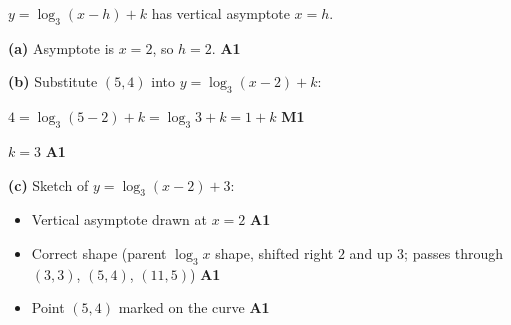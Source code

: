 \documentclass[12pt, twoside]{article}
\begin{document}
\begin{enumerate}[itemsep=0.3cm]
$y = \log_3(x - h) + k$ \quad has vertical asymptote $x = h$.

\textbf{(a)} Asymptote is $x = 2$, so $h = 2$. \hfill \textbf{A1}

\smallskip

\textbf{(b)} Substitute $(5, 4)$ into $y = \log_3(x - 2) + k$:

$4 = \log_3(5 - 2) + k = \log_3 3 + k = 1 + k$ \hfill \textbf{M1}

$k = 3$ \hfill \textbf{A1}

\smallskip

\textbf{(c)} Sketch of $y = \log_3(x - 2) + 3$:
\begin{itemize}\setlength\itemsep{0pt}
  \item Vertical asymptote drawn at $x = 2$ \hfill \textbf{A1}
  \item Correct shape (parent $\log_3 x$ shape, shifted right $2$ and up
  $3$; passes through $(3, 3)$, $(5, 4)$, $(11, 5)$) \hfill \textbf{A1}
  \item Point $(5, 4)$ marked on the curve \hfill \textbf{A1}
\end{itemize}

\end{enumerate}
\end{document}
